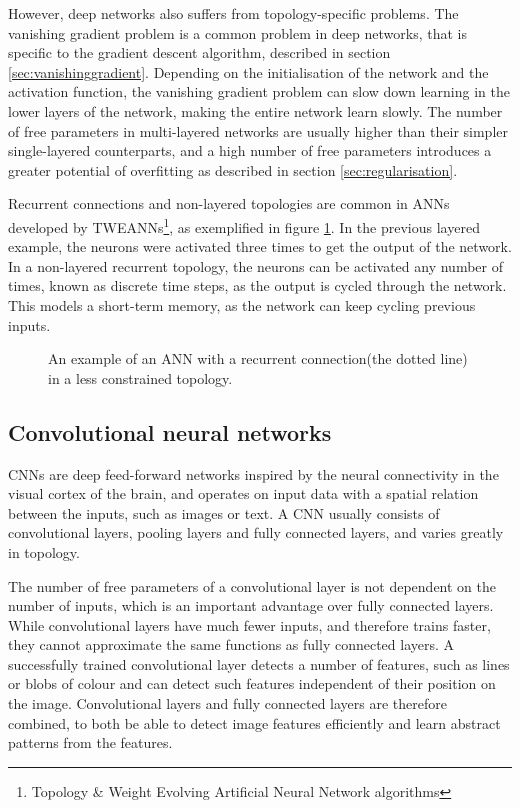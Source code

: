 However, deep networks also suffers from topology-specific problems. The vanishing gradient problem is a common problem in deep networks, that is specific to the gradient descent algorithm, described in section \ref{sec:vanishinggradient}. Depending on the initialisation of the network and the activation function, the vanishing gradient problem can slow down learning in the lower layers of the network, making the entire network learn slowly. The number of free parameters in multi-layered networks are usually higher than their simpler single-layered counterparts, and a high number of free parameters introduces a greater potential of overfitting as described in section \ref{sec:regularisation}.

Recurrent connections and non-layered topologies are common in ANNs developed by TWEANNs\footnote{Topology \& Weight Evolving Artificial Neural Network algorithms}, as exemplified in figure \ref{fig:rt}. In the previous layered example, the neurons were activated three times to get the output of the network. In a non-layered recurrent topology, the neurons can be activated any number of times, known as discrete time steps, as the output is cycled through the network. This models a short-term memory, as the network can keep cycling previous inputs.

\begin{figure}[H]
    \centering
    
    \caption{An example of an ANN with a recurrent connection(the dotted line) in a less constrained topology.}
    \label{fig:rt}
\end{figure}

\subsection{Convolutional neural networks}
CNNs are deep feed-forward networks inspired by the neural connectivity in the visual cortex of the brain, and operates on input data with a spatial relation between the inputs, such as images or text.
A CNN usually consists of convolutional layers, pooling layers and fully connected layers, and varies greatly in topology.

The number of free parameters of a convolutional layer is not dependent on the number of inputs, which is an important advantage over fully connected layers. While convolutional layers have much fewer inputs, and therefore trains faster, they cannot approximate the same functions as fully connected layers. A successfully trained convolutional layer detects a number of features, such as lines or blobs of colour and can detect such features independent of their position on the image. Convolutional layers and fully connected layers are therefore combined, to both be able to detect image features efficiently and learn abstract patterns from the features.

